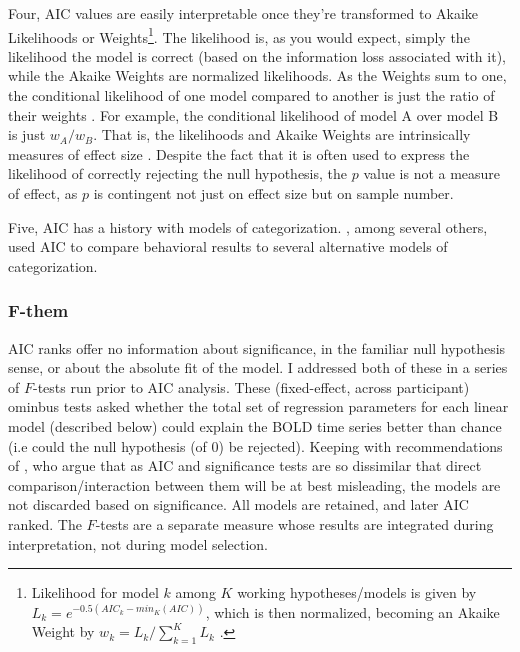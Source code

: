 \documentclass[doc,12pt]{apa}        %
\begin{document}
Four, AIC values are easily interpretable once they're transformed to Akaike Likelihoods or Weights\footnote{
    Likelihood for model $k$ among $K$ working hypotheses/models is given by $L_k = e^{-0.5({AIC}_k - {min}_{K}{(AIC)})}$, which is then normalized, becoming an Akaike Weight by $w_k = L_k / \sum\limits_{k=1}^K L_k$ \cite{Burnham:2004p9621}.}.  The likelihood is, as you would expect, simply the likelihood the model is correct (based on the information loss associated with it), while the Akaike Weights are normalized likelihoods.  As the Weights sum to one, the conditional likelihood of one model compared to another is just the ratio of their weights \cite{Burnham:2004p9621}.  For example, the conditional likelihood of model A over model B is just $w_A/w_B$.  That is, the likelihoods and Akaike Weights are intrinsically measures of effect size \cite{Anderson:2000p9475,Forster:2000p9623}.  Despite the fact that it is often used to express the likelihood of correctly rejecting the null hypothesis, the $p$ value is not a measure of effect, as $p$ is contingent not just on effect size but on sample number.  
    
    Five, AIC has a history with models of categorization. , among several others, used AIC to compare behavioral results to several alternative models of categorization.  

\subsubsection{F-them}
\label{subsub:F}
AIC ranks offer no information about significance, in the familiar null hypothesis sense, or about the absolute fit of the model.  I addressed both of these in a series of $F$-tests run prior to AIC analysis.  These (fixed-effect, across participant) ominbus tests asked whether the total set of regression parameters for each linear model (described below) could explain the BOLD time series better than chance (i.e could the null hypothesis (of 0) be rejected).  Keeping with recommendations of , who argue that as AIC and significance tests are so dissimilar that direct comparison/interaction between them will be at best misleading, the models are not discarded based on significance.  All models are retained, and later AIC ranked.  The $F$-tests are a separate measure whose results are integrated during interpretation, not during model selection.
\end{document}

